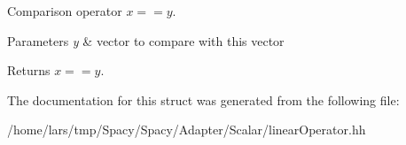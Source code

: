 Comparison operator $ x==y$. 


\begin{DoxyParams}{Parameters}
{\em y} & vector to compare with this vector \\
\hline
\end{DoxyParams}
\begin{DoxyReturn}{Returns}
$ x==y$. 
\end{DoxyReturn}


The documentation for this struct was generated from the following file\+:\begin{DoxyCompactItemize}
\item 
/home/lars/tmp/\+Spacy/\+Spacy/\+Adapter/\+Scalar/linear\+Operator.\+hh\end{DoxyCompactItemize}
